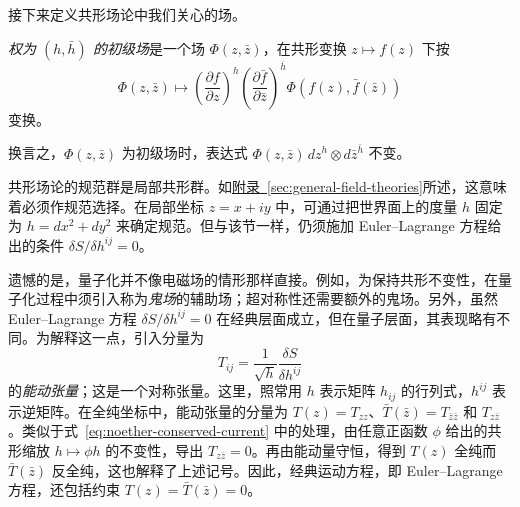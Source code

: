 接下来定义共形场论中我们关心的场。
\begin{definition}\label{def:primary-field}
\emph{权为 $(h,\bar h)$ 的初级场}是一个场 $\Phi(z,\bar z)$，在共形变换 $z\mapsto f(z)$ 下按
\[
\Phi(z,\bar z)\longmapsto
\left(\frac{\partial f}{\partial z}\right)^h
\left(\frac{\partial\bar f}{\partial\bar z}\right)^{\bar h}
\Phi(f(z),\bar f(\bar z))
\]
变换。
\end{definition}
换言之，$\Phi(z,\bar z)$ 为初级场时，表达式 $\Phi(z,\bar z)\,dz^h\otimes d\bar z^{\bar h}$ 不变。

共形场论的规范群是局部共形群。如\hyperref[sec:general-field-theories]{附录~\ref*{sec:general-field-theories}}所述，这意味着必须作规范选择。在局部坐标 $z=x+iy$ 中，可通过把世界面上的度量 $h$ 固定为 $h=dx^2+dy^2$ 来确定规范。但与该节一样，仍须施加 Euler--Lagrange 方程给出的条件 $\delta S/\delta h^{ij}=0$。

遗憾的是，量子化并不像电磁场的情形那样直接。例如，为保持共形不变性，在量子化过程中须引入称为\emph{鬼场}的辅助场；超对称性还需要额外的鬼场。另外，虽然 Euler--Lagrange 方程 $\delta S/\delta h^{ij}=0$ 在经典层面成立，但在量子层面，其表现略有不同。为解释这一点，引入分量为
\[
T_{ij}=\frac1{\sqrt h}\frac{\delta S}{\delta h^{ij}}
\]
的\emph{能动张量}；这是一个对称张量。这里，照常用 $h$ 表示矩阵 $h_{ij}$ 的行列式，$h^{ij}$ 表示逆矩阵。在全纯坐标中，能动张量的分量为 $T(z)=T_{zz}$、$\bar T(\bar z)=T_{\bar z\bar z}$ 和 $T_{z\bar z}$。类似于式~\eqref{eq:noether-conserved-current} 中的处理，由任意正函数 $\phi$ 给出的共形缩放 $h\mapsto\phi h$ 的不变性，导出 $T_{z\bar z}=0$。再由能动量守恒，得到 $T(z)$ 全纯而 $\bar T(\bar z)$ 反全纯，这也解释了上述记号。因此，经典运动方程，即 Euler--Lagrange 方程，还包括约束 $T(z)=\bar T(\bar z)=0$。


